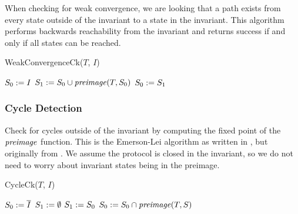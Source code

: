 When checking for weak convergence, we are looking that a path exists from every state outside of the invariant to a state in the invariant.
This algorithm performs backwards reachability from the invariant and returns success if and only if all states can be reached.

\begin{algorithm}[H]{WeakConvergenceCk($T$, $I$)} 
\caption{WeakConvergenceCk} 
\begin{algorithmic}
\STATE $S_0 := I$
 \STATE $S_1 := S_0 \cup \mathit{preimage}(T, S_0)$
  \RETURN \FALSE
 \ENDIF
 \STATE $S_0 := S_1$
\ENDWHILE
\RETURN \TRUE
\end{algorithmic}
\end{algorithm}

\subsubsection{Cycle Detection}

Check for cycles outside of the invariant by computing the fixed point of the $\mathit{preimage}$ function.
This is the Emerson-Lei algorithm as written in \cite{Fisler:2001:BSC:646485.694446}, but originally from \cite{DBLP:conf/lics/EmersonL86}.
We assume the protocol is closed in the invariant, so we do not need to worry about invariant states being in the preimage.

\begin{algorithm}[H]{CycleCk($T$, $I$)} 
\caption{CycleCk} 
\begin{algorithmic}
\STATE $S_0 := \overline{I}$
\STATE $S_1 := \emptyset$
\REPEAT
 \STATE $S_1 := S_0$
 \STATE $S_0 := S_0 \cap \mathit{preimage}(T,S)$

 \RETURN \TRUE
\ELSE
 \RETURN \FALSE
\ENDIF
\end{algorithmic}
\end{algorithm}



